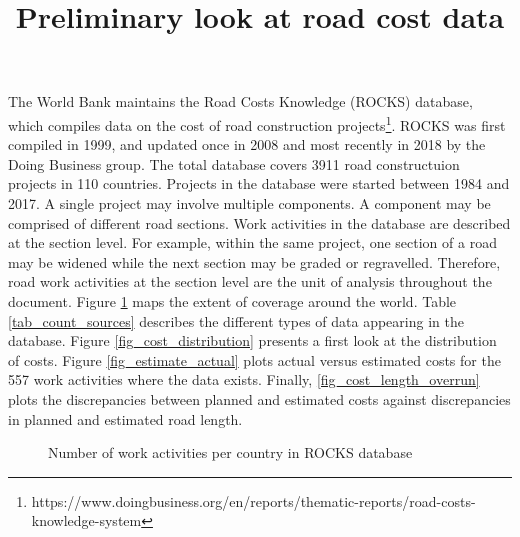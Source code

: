 \documentclass{article}
\title{ Preliminary look at road cost data}
\begin{document}
\maketitle

The World Bank maintains the Road Costs Knowledge (ROCKS) database,
which compiles data on the cost of road construction
projects\footnote{https://www.doingbusiness.org/en/reports/thematic-reports/road-costs-knowledge-system}. ROCKS
was first compiled in 1999, and updated once in 2008 and most recently
in 2018 by the Doing
Business group. The total database covers 3911 road
constructuion  projects in 110 countries. Projects in the
database were started between 1984 and 2017. A single project may
involve multiple components.  A component may be comprised of different
road sections. Work activities in the database are described at the
section level. For example, within the same project, one section of a
road may be widened while the next section may be  graded or
regravelled. Therefore, road work activities at the section level are
the unit of analysis throughout the document. Figure
\ref{fig_world_map} maps the extent of coverage around the
world. Table \ref{tab_count_sources} describes the different types of
data appearing in the database. Figure \ref{fig_cost_distribution}
presents a first look at the distribution of costs. Figure
\ref{fig_estimate_actual} plots actual versus estimated costs for the
557 work activities where the data exists. Finally,
\ref{fig_cost_length_overrun} plots the discrepancies between planned
and estimated costs against discrepancies in planned and estimated
road length.

\begin{figure}
  \caption{Number of work activities per country in ROCKS database}
\label{fig_world_map}
\end{figure}


\end{document}
